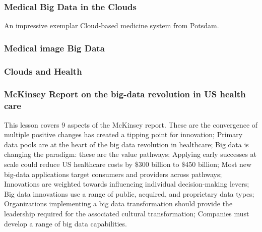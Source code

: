 \subsubsection{Medical Big Data in the
Clouds}\label{medical-big-data-in-the-clouds}

An impressive exemplar Cloud-based medicine system from Potsdam.



\subsubsection{Medical image Big Data}\label{medical-image-big-data}


\subsubsection{Clouds and Health}\label{clouds-and-health}



\subsubsection{McKinsey Report on the big-data revolution in US health
care}\label{mckinsey-report-on-the-big-data-revolution-in-us-health-care}

This lesson covers 9 aspects of the McKinsey report. These are the
convergence of multiple positive changes has created a tipping point for
innovation; Primary data pools are at the heart of the big data
revolution in healthcare; Big data is changing the paradigm: these are
the value pathways; Applying early successes at scale could reduce US
healthcare costs by \$300 billion to \$450 billion; Most new big-data
applications target consumers and providers across pathways; Innovations
are weighted towards influencing individual decision-making levers; Big
data innovations use a range of public, acquired, and proprietary data
types; Organizations implementing a big data transformation should
provide the leadership required for the associated cultural
transformation; Companies must develop a range of big data capabilities.


